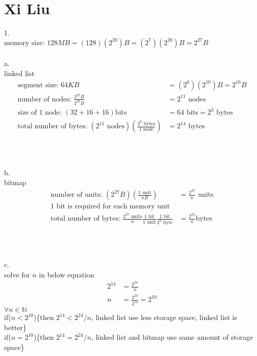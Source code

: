 \documentclass[12pt, border = 4pt, multi]{article} %
\begin{document}
\section*{Xi Liu}
1.\\
$\text{memory size: } 128 MB = (128)(2 ^ {20})B = (2 ^ 7)(2 ^ {20})B = 2 ^ {27}B$\\
\\
a.\\
linked list
\begin{align*}
\text{segment size: } 64KB &= (2 ^ 6)(2 ^ {10})B = 2 ^ {16}B\\
\text{number of nodes: } \frac{2 ^ {27}B}{2 ^ {16}B} &= 2 ^ {11} \text{ nodes}\\
\text{size of 1 node: } (32 + 16 + 16)\text{bits} &= 64\text{ bits} = 2 ^ 3\text{ bytes}\\
\text{total number of bytes: } (2 ^ {11} \text{ nodes})\left(\frac{2 ^ 3\text{ bytes}}{1 \text{ node}}\right) &= \boxed{2 ^ {14} \text{ bytes}}\\
\end{align*}
\\
\\
\\
b.\\
bitmap
\begin{align*}
\text{number of units: }(2 ^ {27}B)\left(\frac{1 \text{ unit}}{nB}\right) &= \frac{2 ^ {27}}{n} \text{ units}\\
\text{1 bit is required for each memory unit}\\
\text{total number of bytes: }\frac{2 ^ {27} \text{ units}}{n}\frac{1 \text{ bit}}{1 \text{ unit}}\frac{1 \text{ bit}}{2 ^ 3 \text{ byte}} &= \boxed{\frac{2 ^ {24}}{n} \text{bytes}}\\
\end{align*}
\\
\\
\\
c.\\
solve for $n$ in below equation
\begin{align*}
2 ^ {14} &= \frac{2 ^ {24}}{n}\\
n &= \frac{2 ^ {24}}{2 ^ {14}} = 2 ^ {10}
\end{align*}
$\forall n \in \mathbb{N}$\\
if($n < 2 ^ {10}$)\{then $2 ^ {14} < 2 ^ {24} / n$, linked list use less storage space, linked list is better\}\\
if($n = 2 ^ {10}$)\{then $2 ^ {14} = 2 ^ {24} / n$, linked list and bitmap use same amount of storage space\}\\
\end{document}
